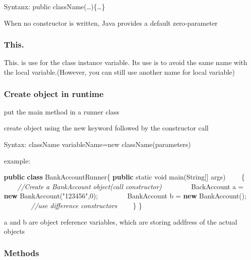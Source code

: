 \documentclass[
  paper=a4,
  ,captions=tableheading
]{scrartcl}
\newenvironment{Shaded}{}{}
\newcommand{\BuiltInTok}[1]{#1}
\newcommand{\CommentTok}[1]{\textcolor[rgb]{0.38,0.63,0.69}{\textit{#1}}}
\newcommand{\DataTypeTok}[1]{\textcolor[rgb]{0.56,0.13,0.00}{#1}}
\newcommand{\DecValTok}[1]{\textcolor[rgb]{0.25,0.63,0.44}{#1}}
\newcommand{\FunctionTok}[1]{\textcolor[rgb]{0.02,0.16,0.49}{#1}}
\newcommand{\KeywordTok}[1]{\textcolor[rgb]{0.00,0.44,0.13}{\textbf{#1}}}
\newcommand{\NormalTok}[1]{#1}
\newcommand{\StringTok}[1]{\textcolor[rgb]{0.25,0.44,0.63}{#1}}
\begin{document}
Syntanx: public className(\ldots{})\{\ldots{}\}

When no constructor is written, Java provides a default zero-parameter

\hypertarget{this.}{%
\subsubsection{This.}\label{this.}}

This. is use for the class instance variable. Its use is to avoid the
same name with the local variable.(However, you can still use another
name for local variable)

\hypertarget{create-object-in-runtime}{%
\subsubsection{Create object in
runtime}\label{create-object-in-runtime}}

put the main method in a runner class

create object using the new keyword followed by the constructor call

Syntax: className variableName=new className(parameters)

example:

\begin{Shaded}
\begin{Highlighting}[]
\KeywordTok{public} \KeywordTok{class}\NormalTok{ BankAccountRunner\{}
    \KeywordTok{public} \DataTypeTok{static} \DataTypeTok{void} \FunctionTok{main}\NormalTok{(}\BuiltInTok{String}\NormalTok{[] args)}
\NormalTok{    \{}
        \CommentTok{//Create a BankAccount object(call constructor)}
\NormalTok{        BackAccount a = }\KeywordTok{new} \FunctionTok{BankAccount}\NormalTok{(}\StringTok{"123456"}\NormalTok{,}\DecValTok{0}\NormalTok{);}
\NormalTok{        BankAccount b = }\KeywordTok{new} \FunctionTok{BankAccount}\NormalTok{();}
        \CommentTok{//use difference constructors}
\NormalTok{    \} }
\NormalTok{\}}
\end{Highlighting}
\end{Shaded}

a and b are object reference variables, which are storing addfress of
the actual objects

\hypertarget{methods}{%
\subsubsection{Methods}\label{methods}}
\end{document}
